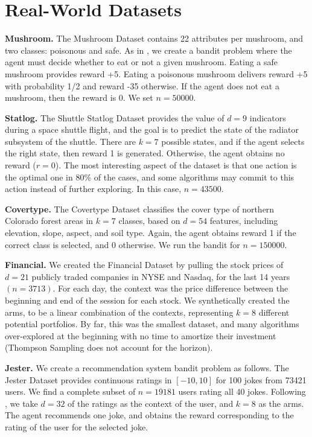 \documentclass{article} \usepackage{iclr2018_conference,times}
\begin{document}
\clearpage

\section{Real-World Datasets}\label{s:datasets}

\textbf{Mushroom.} The Mushroom Dataset \citep{schlimmer1981mushroom} contains 22 attributes per mushroom, and two classes: poisonous and safe. As in \cite{blundell2015weight}, we create a bandit problem where the agent must decide whether to eat or not a given mushroom.
Eating a safe mushroom provides reward +5.
Eating a poisonous mushroom delivers reward +5 with probability 1/2 and reward -35 otherwise.
If the agent does not eat a mushroom, then the reward is 0.
We set $n = 50000$.


\textbf{Statlog.} The Shuttle Statlog Dataset \citep{asuncion2007uci} provides the value of $d = 9$ indicators during a space shuttle flight, and the goal is to predict the state of the radiator subsystem of the shuttle.
There are $k = 7$ possible states, and if the agent selects the right state, then reward 1 is generated.
Otherwise, the agent obtains no reward ($r=0$).
The most interesting aspect of the dataset is that one action is the optimal one in 80\% of the cases, and some algorithms may commit to this action instead of further exploring.
In this case, $n = 43500$.


\textbf{Covertype.} The Covertype Dataset \citep{asuncion2007uci} classifies the cover type of northern Colorado forest areas in $k = 7$ classes, based on $d = 54$ features, including elevation, slope, aspect, and soil type.
Again, the agent obtains reward 1 if the correct class is selected, and 0 otherwise.
We run the bandit for $n = 150000$.

\textbf{Financial.} We created the Financial Dataset by pulling the stock prices of $d = 21$ publicly traded companies in NYSE and Nasdaq, for the last 14 years $(n = 3713)$.
For each day, the context was the price difference between the beginning and end of the session for each stock.
We synthetically created the arms, to be a linear combination of the contexts, representing $k = 8$ different potential portfolios.
By far, this was the smallest dataset, and many algorithms over-explored at the beginning with no time to amortize their investment (Thompson Sampling does not account for the horizon).

\textbf{Jester.} We create a recommendation system bandit problem as follows.
The Jester Dataset \citep{goldberg2001eigentaste} provides continuous ratings in $[-10, 10]$ for 100 jokes from 73421 users.
We find a complete subset of $n = 19181$ users rating all 40 jokes. Following \cite{pmlr-v70-riquelme17a}, we take $d = 32$ of the ratings as the context of the user, and $k=8$ as the arms. The agent recommends one joke, and obtains the reward corresponding to the rating of the user for the selected joke.
\end{document}
